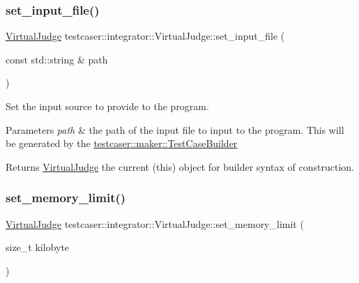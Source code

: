 \subsubsection{\texorpdfstring{set\_input\_file()}{set\_input\_file()}}
{\footnotesize\ttfamily \mbox{\hyperlink{classtestcaser_1_1integrator_1_1VirtualJudge}{Virtual\+Judge}} testcaser\+::integrator\+::\+Virtual\+Judge\+::set\+\_\+input\+\_\+file (\begin{DoxyParamCaption}\item[{const std\+::string \&}]{path }\end{DoxyParamCaption})\hspace{0.3cm}{\ttfamily [inline]}}



Set the input source to provide to the program. 


\begin{DoxyParams}{Parameters}
{\em path} & the path of the input file to input to the program. This will be generated by the \mbox{\hyperlink{classtestcaser_1_1maker_1_1TestCaseBuilder}{testcaser\+::maker\+::\+Test\+Case\+Builder}} \\
\hline
\end{DoxyParams}
\begin{DoxyReturn}{Returns}
\mbox{\hyperlink{classtestcaser_1_1integrator_1_1VirtualJudge}{Virtual\+Judge}} the current (this) object for builder syntax of construction. 
\end{DoxyReturn}
\mbox{\label{classtestcaser_1_1integrator_1_1VirtualJudge_a8ac8e323d9f69fb4e1f6ee2e9aa1ae9f}} 
\subsubsection{\texorpdfstring{set\_memory\_limit()}{set\_memory\_limit()}}
{\footnotesize\ttfamily \mbox{\hyperlink{classtestcaser_1_1integrator_1_1VirtualJudge}{Virtual\+Judge}} testcaser\+::integrator\+::\+Virtual\+Judge\+::set\+\_\+memory\+\_\+limit (\begin{DoxyParamCaption}\item[{size\+\_\+t}]{kilobyte }\end{DoxyParamCaption})\hspace{0.3cm}{\ttfamily [inline]}}



